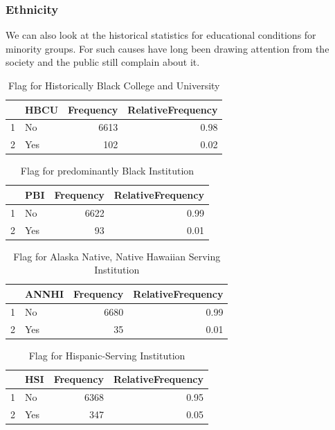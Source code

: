 \documentclass{article}\usepackage[]{graphicx}\usepackage[]{color}
\begin{document}
\subsubsection{Ethnicity}

We can also look at the historical statistics for educational conditions for minority groups. For such causes have long been drawing attention from the society and the public still complain about it.

\begin{table}[ht]
\centering
\begin{tabular}{rlrr}
  \hline
 & HBCU & Frequency & RelativeFrequency \\ 
  \hline
1 & No & 6613 & 0.98 \\ 
  2 & Yes & 102 & 0.02 \\ 
   \hline
\end{tabular}
\caption{Flag for Historically Black College and University} 
\end{table}
\begin{table}[ht]
\centering
\begin{tabular}{rlrr}
  \hline
 & PBI & Frequency & RelativeFrequency \\ 
  \hline
1 & No & 6622 & 0.99 \\ 
  2 & Yes &  93 & 0.01 \\ 
   \hline
\end{tabular}
\caption{Flag for predominantly Black Institution} 
\end{table}
\begin{table}[ht]
\centering
\begin{tabular}{rlrr}
  \hline
 & ANNHI & Frequency & RelativeFrequency \\ 
  \hline
1 & No & 6680 & 0.99 \\ 
  2 & Yes &  35 & 0.01 \\ 
   \hline
\end{tabular}
\caption{Flag for Alaska Native, Native Hawaiian Serving Institution} 
\end{table}
\begin{table}[ht]
\centering
\begin{tabular}{rlrr}
  \hline
 & HSI & Frequency & RelativeFrequency \\ 
  \hline
1 & No & 6368 & 0.95 \\ 
  2 & Yes & 347 & 0.05 \\ 
   \hline
\end{tabular}
\caption{Flag for Hispanic-Serving Institution} 
\end{table}
\end{document}
